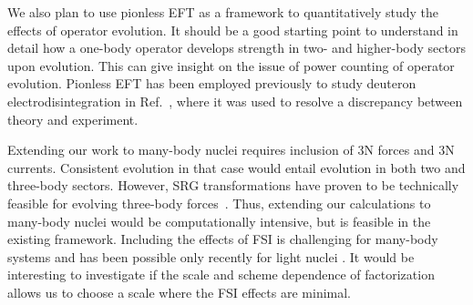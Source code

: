 	We also plan to use pionless EFT as a framework to quantitatively study the
	effects of operator evolution.  It should be a good starting point to
	understand in detail how a one-body operator develops strength in two- and
	higher-body sectors upon evolution.  This can give insight on the issue of
	power	counting of operator evolution.  Pionless EFT has been employed
	previously to
	study deuteron electrodisintegration in Ref.~\cite{Christlmeier:2008ye}, where
	it was used to resolve a discrepancy between theory and experiment.

	Extending our work to many-body nuclei requires inclusion of 3N forces and 3N
	currents.  Consistent evolution in that case would entail evolution in both
	two	and three-body sectors.  However, SRG transformations have proven to be
	technically feasible for evolving three-body
	forces~\cite{Jurgenson:2009qs,Jurgenson:2010wy,Hebeler:2012pr,Wendt:2013bla}.
	Thus, extending our calculations to many-body nuclei would be computationally
	intensive, but is feasible in the existing framework.  Including the effects
	of FSI is challenging for many-body systems and has been
	possible only recently for light nuclei \cite{Bacca:2014tla, Lovato:2015qka}.
	It would be interesting to investigate if the scale and scheme dependence of
	factorization allows us to choose a scale where the FSI effects are minimal.
